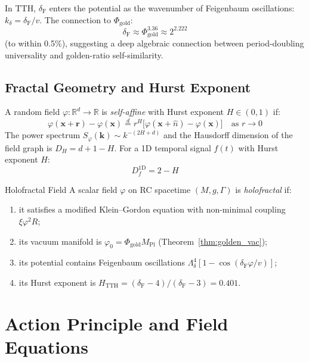\documentclass[12pt,a4paper]{article}
\newcommand{\MPl}{M_{\mathrm{Pl}}}
\newcommand{\Feig}{\delta_{\mathrm{F}}}
\newcommand{\Hurst}{H_{\mathrm{TTH}}}
\numberwithin{equation}{section}
\begin{document}
In TTH, $\Feig$ enters the potential as the wavenumber of Feigenbaum oscillations:
$k_\delta = \Feig/v$. The connection to $\Phi_{\mathrm{gold}}$:
\begin{equation}
  \Feig \approx \Phi_{\mathrm{gold}}^{3.36} \approx 2^{2.222}
  \label{eq:delta_phi_relation}
\end{equation}
(to within 0.5\%), suggesting a deep algebraic connection between
period-doubling universality and golden-ratio self-similarity.

\subsection{Fractal Geometry and Hurst Exponent}

A random field $\varphi: \mathbb{R}^d \to \mathbb{R}$ is \emph{self-affine}
with Hurst exponent $H \in (0,1)$ if:
\begin{equation}
  \varphi(\mathbf{x} + \mathbf{r}) - \varphi(\mathbf{x})
  \overset{d}{=} r^H \bigl[\varphi(\mathbf{x}+\hat{n}) - \varphi(\mathbf{x})\bigr]
  \quad\text{as } r\to 0
  \label{eq:self_affine}
\end{equation}
The power spectrum $S_\varphi(\mathbf{k}) \sim k^{-(2H+d)}$ and the
Hausdorff dimension of the field graph is $D_H = d+1-H$.
For a 1D temporal signal $f(t)$ with Hurst exponent $H$:
\begin{equation}
  D_f^{\text{1D}} = 2 - H
  \label{eq:fractal_dim_1d}
\end{equation}

\begin{definition}{Holofractal Field}{}
A scalar field $\varphi$ on RC spacetime $(M,g,\Gamma)$ is \emph{holofractal} if:
\begin{enumerate}[label=(\arabic*)]
\item it satisfies a modified Klein--Gordon equation with non-minimal coupling $\xi\varphi^2 R$;
\item its vacuum manifold is $\varphi_0 = \Phi_{\mathrm{gold}}\MPl$ (Theorem~\ref{thm:golden_vac});
\item its potential contains Feigenbaum oscillations $\Lambda_\delta^4[1-\cos(\Feig\varphi/v)]$;
\item its Hurst exponent is $\Hurst = (\Feig-4)/(\Feig-3) = 0.401$.
\end{enumerate}
\end{definition}

\section{Action Principle and Field Equations}
\label{sec:field_equations}
\end{document}
